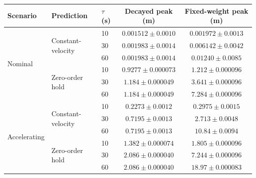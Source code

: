 \begin{tabular}{lllcc}
\toprule
Scenario & Prediction & $\tau$ (s) & Decayed peak (m) & Fixed-weight peak (m) \\
\midrule
\multirow{6}{*}{Nominal} & \multirow{3}{*}{Constant-velocity} & 10 & $0.001512 \pm 0.0010$ & $0.001972 \pm 0.0013$ \\
 &  & 30 & $0.001983 \pm 0.0014$ & $0.006142 \pm 0.0042$ \\
 &  & 60 & $0.001983 \pm 0.0014$ & $0.01240 \pm 0.0085$ \\
 & \multirow{3}{*}{Zero-order hold} & 10 & $0.9277 \pm 0.000073$ & $1.212 \pm 0.000096$ \\
 &  & 30 & $1.184 \pm 0.000049$ & $3.641 \pm 0.000096$ \\
 &  & 60 & $1.184 \pm 0.000049$ & $7.284 \pm 0.000096$ \\
\midrule
\multirow{6}{*}{Accelerating} & \multirow{3}{*}{Constant-velocity} & 10 & $0.2273 \pm 0.0012$ & $0.2975 \pm 0.0015$ \\
 &  & 30 & $0.7195 \pm 0.0013$ & $2.713 \pm 0.0048$ \\
 &  & 60 & $0.7195 \pm 0.0013$ & $10.84 \pm 0.0094$ \\
 & \multirow{3}{*}{Zero-order hold} & 10 & $1.382 \pm 0.000074$ & $1.805 \pm 0.000096$ \\
 &  & 30 & $2.086 \pm 0.000040$ & $7.244 \pm 0.000096$ \\
 &  & 60 & $2.086 \pm 0.000040$ & $18.97 \pm 0.000083$ \\
\bottomrule
\end{tabular}
